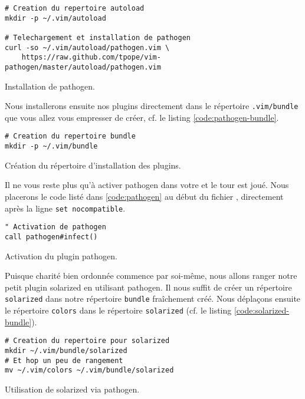 \begin{listing}[H]
\begin{verbatim}
# Creation du repertoire autoload
mkdir -p ~/.vim/autoload 

# Telechargement et installation de pathogen
curl -so ~/.vim/autoload/pathogen.vim \
    https://raw.github.com/tpope/vim-pathogen/master/autoload/pathogen.vim
\end{verbatim}
  \caption{Installation de pathogen.}
  \label{code:pathogen-install}
\end{listing}

Nous installerons ensuite nos plugins directement dans le répertoire \Verb|.vim/bundle| que vous allez vous empresser de créer, cf. le listing \ref{code:pathogen-bundle}.

\begin{listing}[H]
\begin{verbatim}
# Creation du repertoire bundle
mkdir -p ~/.vim/bundle
\end{verbatim}
  \caption{Création du répertoire d'installation des plugins.}
  \label{code:pathogen-bundle}
\end{listing}

Il ne vous reste plus qu'à activer pathogen dans votre \vimrc et le tour est joué. Nous placerons le code listé dans 
\ref{code:pathogen} au début du fichier \vimrc, directement après la ligne \Verb|set nocompatible|.

\begin{listing}[H]

\begin{verbatim}
" Activation de pathogen
call pathogen#infect()
\end{verbatim}
\caption{Activation du plugin pathogen.}
\label{code:pathogen}
\end{listing}

Puisque charité bien ordonnée commence par soi-même, nous allons ranger notre petit plugin solarized en utilisant pathogen. Il nous suffit de créer un répertoire \Verb|solarized| dans notre répertoire \Verb|bundle| fraîchement créé. Nous déplaçons ensuite le répertoire \Verb|colors| dans le répertoire \Verb|solarized| (cf. le listing \ref{code:solarized-bundle}).

\begin{listing}[H]
\begin{verbatim}
# Creation du repertoire pour solarized
mkdir ~/.vim/bundle/solarized
# Et hop un peu de rangement
mv ~/.vim/colors ~/.vim/bundle/solarized
\end{verbatim}
  \caption{Utilisation de solarized via pathogen.}
  \label{code:solarized-bundle}
\end{listing}

